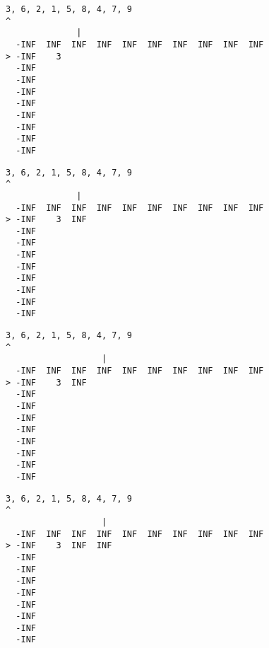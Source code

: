{ \begin{verbatim}
3, 6, 2, 1, 5, 8, 4, 7, 9
^
              |
  -INF  INF  INF  INF  INF  INF  INF  INF  INF  INF
> -INF    3                                        
  -INF                                             
  -INF                                             
  -INF                                             
  -INF                                             
  -INF                                             
  -INF                                             
  -INF                                             
  -INF                                             
\end{verbatim} }

{ \begin{verbatim}
3, 6, 2, 1, 5, 8, 4, 7, 9
^
              |
  -INF  INF  INF  INF  INF  INF  INF  INF  INF  INF
> -INF    3  INF                                   
  -INF                                             
  -INF                                             
  -INF                                             
  -INF                                             
  -INF                                             
  -INF                                             
  -INF                                             
  -INF                                             
\end{verbatim} }

{ \begin{verbatim}
3, 6, 2, 1, 5, 8, 4, 7, 9
^
                   |
  -INF  INF  INF  INF  INF  INF  INF  INF  INF  INF
> -INF    3  INF                                   
  -INF                                             
  -INF                                             
  -INF                                             
  -INF                                             
  -INF                                             
  -INF                                             
  -INF                                             
  -INF                                             
\end{verbatim} }

{ \begin{verbatim}
3, 6, 2, 1, 5, 8, 4, 7, 9
^
                   |
  -INF  INF  INF  INF  INF  INF  INF  INF  INF  INF
> -INF    3  INF  INF                              
  -INF                                             
  -INF                                             
  -INF                                             
  -INF                                             
  -INF                                             
  -INF                                             
  -INF                                             
  -INF                                             
\end{verbatim} }

